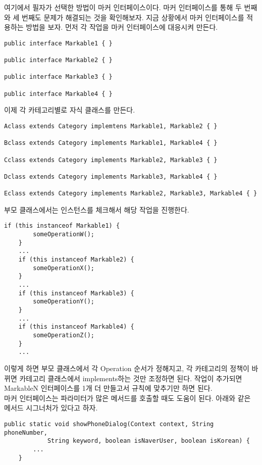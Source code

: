 여기에서 필자가 선택한 방법이 마커 인터페이스이다. 마커 인터페이스를 통해 두 번째와 세 번째도 문제가 해결되는 것을 확인해보자.
지금 상황에서 마커 인터페이스를 적용하는 방법을 보자.
먼저 각 작업을 마커 인터페이스에 대응시켜 만든다.\\

\begin{lstlisting}[frame=single]
public interface Markable1 { }

public interface Markable2 { }

public interface Markable3 { }

public interface Markable4 { }
\end{lstlisting}

 
이제 각 카테고리별로 자식 클래스를 만든다.

\begin{lstlisting}[frame=single]
Aclass extends Category implemtens Markable1, Markable2 { }

Bclass extends Category implements Markable1, Markable4 { }

Cclass extends Category implements Markable2, Markable3 { }

Dclass extends Category implements Markable3, Markable4 { }

Eclass extends Category implements Markable2, Markable3, Markable4 { }
\end{lstlisting}

 
부모 클래스에서는 인스턴스를 체크해서 해당 작업을 진행한다.
\begin{lstlisting}[frame=single]
	if (this instanceof Markable1) { 
		someOperationW();
	}
 	...
	if (this instanceof Markable2) { 
		someOperationX();
	}
	...
	if (this instanceof Markable3) { 
		someOperationY(); 
	} 
	...
	if (this instanceof Markable4) { 
		someOperationZ();
	}
	...
\end{lstlisting}
이렇게 하면 부모 클래스에서 각 Operation 순서가 정해지고, 
각 카테고리의 정책이 바뀌면 카테고리 클래스에서 implements하는 것만 조정하면 된다.
작업이 추가되면 MarkableN 인터페이스를 1개 더 만들고서 규칙에 맞추기만 하면 된다.\\

마커 인터페이스는 파라미터가 많은 메서드를 호출할 때도 도움이 된다.
아래와 같은 메서드 시그너처가 있다고 하자.
\begin{lstlisting}[frame=single]
	public static void showPhoneDialog(Context context, String phoneNumber, 
			String keyword, boolean isNaverUser, boolean isKorean) {
		...
	}
\end{lstlisting}

